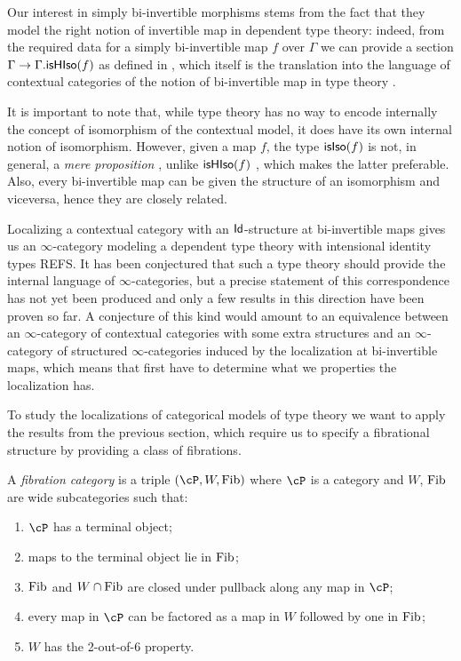 \begin{rmk}
  Our interest in simply bi-invertible morphisms stems from the fact that they
  model the right notion of invertible map in dependent type theory: indeed,
  from the
  required data for a simply bi-invertible map $f$ over $\Gamma$ we can provide
  a section $\Gamma\rightarrow\Gamma.\mathsf{isHIso}({f})$ 
  as defined in \cite[Def.~B.3.3]{KL12}, which itself is the translation into
  the language of contextual categories of the notion of bi-invertible map in
  type theory \cite[Def~4.3.1]{Uni13}.

  It is important to note that, while type theory has no way to encode
  internally the concept of isomorphism of the contextual model, it does have
  its own internal notion of isomorphism. However, given a map $f$, the type
  $\mathsf{isIso}({f})$ is not, in general, a \emph{mere proposition}
  \cite[Def.~3.3.1]{Uni13}, unlike $\mathsf{isHIso}({f})$
  \cite[Thm.~4.3.2]{Uni13}, which makes the latter
  preferable. Also, every bi-invertible map can be given the structure of an
  isomorphism and viceversa, hence they are closely related.
\end{rmk}

\begin{rmk}
Localizing a contextual category with an $\operatorname{\mathsf{Id}}$-structure at bi-invertible maps
gives us an $\infty$-category modeling a dependent type theory with intensional
identity types REFS. It has been conjectured that such a type theory should
provide the internal language of $\infty$-categories, but a precise statement of
this correspondence has not yet been produced and only a few results in this
direction have
been proven so far. A conjecture of this kind would amount to an equivalence
between
an $\infty$-category of contextual categories with some extra structures and an
$\infty$-category of structured $\infty$-categories induced by the localization
at bi-invertible maps, which means that first have to determine what we
properties the localization has.
\end{rmk}

To study the localizations of categorical models of type theory we want to apply
the results from the previous section, which require us to specify a
fibrational structure by providing a class
of fibrations.

\begin{defn}
  A \emph{fibration category} is a triple $(\cP,W,\fib)$ where $\cP$ is a
  category and $W$, $\operatorname{Fib}$ are wide subcategories such that:
  \begin{enumerate}
    \item $\cP$ has a terminal object;
    \item maps to the terminal object lie in $\operatorname{Fib}$;
    \item $\operatorname{Fib}$ and $W\cap \operatorname{Fib}$ are closed under pullback along any map in $\cP$;
    \item every map in $\cP$ can be factored as a map in $W$ followed by one in
      $\operatorname{Fib}$;
    \item $W$ has the 2-out-of-6 property.
  \end{enumerate}
\end{defn}

